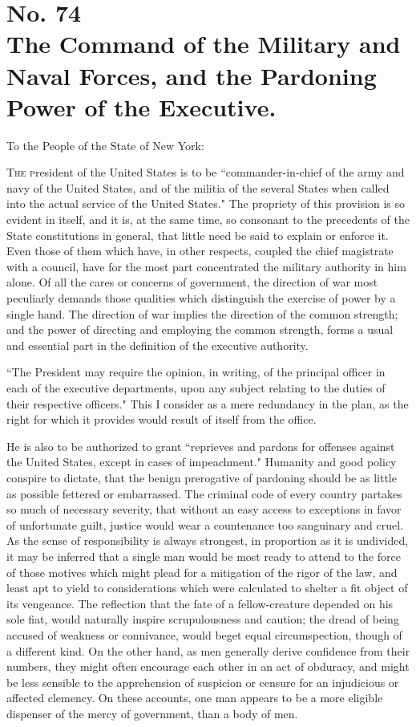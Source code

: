 \chapter[No. 74: The Command of the Military and Naval Forces, and the Pardoning Power of the Executive.]{No. 74\\ {\small The Command of the Military and Naval Forces, and the Pardoning Power of the Executive.}}
To the People of the State of New York:
\vspace{.4cm}

\textsc{The p}resident of the United States is to be ``commander-in-chief of the army and navy of the United States, and of the militia of the several States when called into the actual service of the United States." The propriety of this provision is so evident in itself, and it is, at the same time, so consonant to the precedents of the State constitutions in general, that little need be said to explain or enforce it. Even those of them which have, in other respects, coupled the chief magistrate with a council, have for the most part concentrated the military authority in him alone. Of all the cares or concerns of government, the direction of war most peculiarly demands those qualities which distinguish the exercise of power by a single hand. The direction of war implies the direction of the common strength; and the power of directing and employing the common strength, forms a usual and essential part in the definition of the executive authority.

``The President may require the opinion, in writing, of the principal officer in each of the executive departments, upon any subject relating to the duties of their respective officers." This I consider as a mere redundancy in the plan, as the right for which it provides would result of itself from the office.

He is also to be authorized to grant ``reprieves and pardons for offenses against the United States, except in cases of impeachment." Humanity and good policy conspire to dictate, that the benign prerogative of pardoning should be as little as possible fettered or embarrassed. The criminal code of every country partakes so much of necessary severity, that without an easy access to exceptions in favor of unfortunate guilt, justice would wear a countenance too sanguinary and cruel. As the sense of responsibility is always strongest, in proportion as it is undivided, it may be inferred that a single man would be most ready to attend to the force of those motives which might plead for a mitigation of the rigor of the law, and least apt to yield to considerations which were calculated to shelter a fit object of its vengeance. The reflection that the fate of a fellow-creature depended on his sole fiat, would naturally inspire scrupulousness and caution; the dread of being accused of weakness or connivance, would beget equal circumspection, though of a different kind. On the other hand, as men generally derive confidence from their numbers, they might often encourage each other in an act of obduracy, and might be less sensible to the apprehension of suspicion or censure for an injudicious or affected clemency. On these accounts, one man appears to be a more eligible dispenser of the mercy of government, than a body of men.

